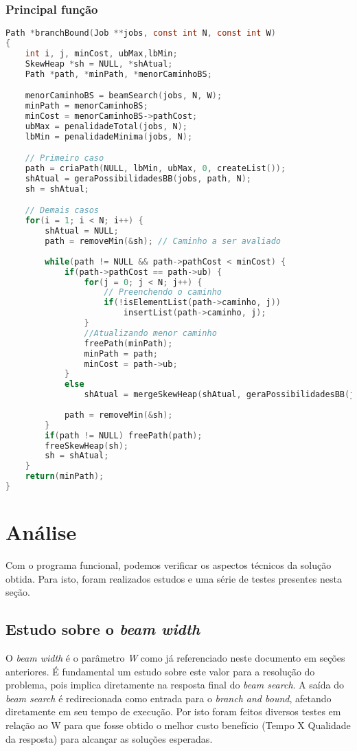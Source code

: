 \documentclass[
	11pt,				%
	oneside,			%
	a4paper,			%
	english,			%
	brazil,				%
	]{article}
\begin{document}
\subsubsection{Principal função}
\begin{lstlisting}[language=C, caption=Função branchBound]
Path *branchBound(Job **jobs, const int N, const int W)
{
    int i, j, minCost, ubMax,lbMin;
    SkewHeap *sh = NULL, *shAtual;
    Path *path, *minPath, *menorCaminhoBS;

    menorCaminhoBS = beamSearch(jobs, N, W);
    minPath = menorCaminhoBS;
    minCost = menorCaminhoBS->pathCost;
    ubMax = penalidadeTotal(jobs, N);
    lbMin = penalidadeMinima(jobs, N);

    // Primeiro caso
    path = criaPath(NULL, lbMin, ubMax, 0, createList());
    shAtual = geraPossibilidadesBB(jobs, path, N);
    sh = shAtual;

    // Demais casos
    for(i = 1; i < N; i++) {
        shAtual = NULL;
        path = removeMin(&sh); // Caminho a ser avaliado
        
		while(path != NULL && path->pathCost < minCost) {
            if(path->pathCost == path->ub) {
                for(j = 0; j < N; j++) {
                    // Preenchendo o caminho
                    if(!isElementList(path->caminho, j))
						insertList(path->caminho, j); 
                }
                //Atualizando menor caminho
                freePath(minPath);
                minPath = path;
                minCost = path->ub;
            }
            else
                shAtual = mergeSkewHeap(shAtual, geraPossibilidadesBB(jobs, path, N));
            
            path = removeMin(&sh);
        }
        if(path != NULL) freePath(path);
        freeSkewHeap(sh);
        sh = shAtual;
    }
    return(minPath);
}
\end{lstlisting}

\section{Análise}
Com o programa funcional, podemos verificar os aspectos técnicos da solução obtida. Para isto, foram realizados estudos e uma série de testes presentes nesta seção.

\subsection{Estudo sobre o \textit{beam width}}
\label{sec:w}
O \textit{beam width} é o parâmetro \textit{W} como já referenciado neste documento em seções anteriores. É fundamental um estudo sobre este valor para a resolução do problema, pois implica diretamente na resposta final do \textit{beam search}. A saída do \textit{beam search} é redirecionada como entrada para o \textit{branch and bound}, afetando diretamente em seu tempo de execução. Por isto foram feitos diversos testes em relação ao W para que fosse obtido o melhor custo benefício (Tempo X Qualidade da resposta) para alcançar as soluções esperadas.
\end{document}
